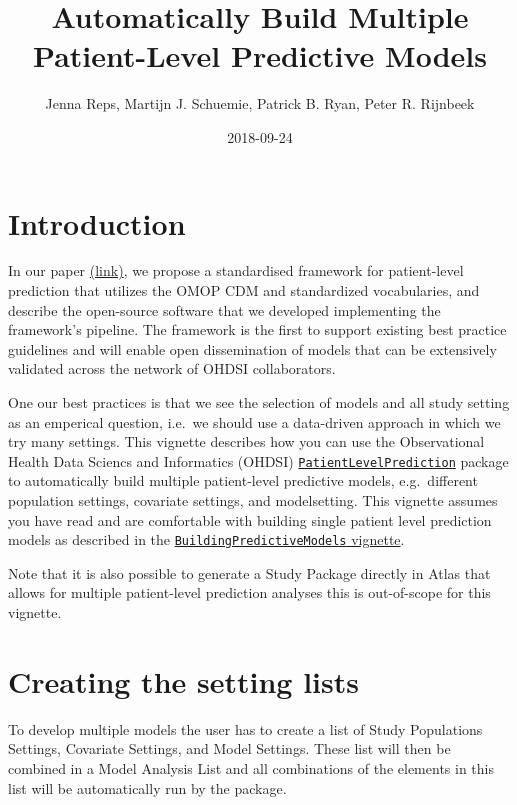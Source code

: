 \documentclass[]{article}
\title{Automatically Build Multiple Patient-Level Predictive Models}
\author{Jenna Reps, Martijn J. Schuemie, Patrick B. Ryan, Peter R. Rijnbeek}
\date{2018-09-24}
\begin{document}
\maketitle

{
\setcounter{tocdepth}{2}
\tableofcontents
}
\section{Introduction}\label{introduction}

In our paper
\href{https://academic.oup.com/jamia/article/25/8/969/4989437}{(link)},
we propose a standardised framework for patient-level prediction that
utilizes the OMOP CDM and standardized vocabularies, and describe the
open-source software that we developed implementing the framework's
pipeline. The framework is the first to support existing best practice
guidelines and will enable open dissemination of models that can be
extensively validated across the network of OHDSI collaborators.

One our best practices is that we see the selection of models and all
study setting as an emperical question, i.e.~we should use a data-driven
approach in which we try many settings. This vignette describes how you
can use the Observational Health Data Sciencs and Informatics (OHDSI)
\href{http://github.com/OHDSI/PatientLevelPrediction}{\texttt{PatientLevelPrediction}}
package to automatically build multiple patient-level predictive models,
e.g.~different population settings, covariate settings, and
modelsetting. This vignette assumes you have read and are comfortable
with building single patient level prediction models as described in the
\href{https://github.com/OHDSI/PatientLevelPrediction/blob/master/inst/doc/BuildingPredictiveModels.pdf}{\texttt{BuildingPredictiveModels}
vignette}.

Note that it is also possible to generate a Study Package directly in
Atlas that allows for multiple patient-level prediction analyses this is
out-of-scope for this vignette.

\section{Creating the setting lists}\label{creating-the-setting-lists}

To develop multiple models the user has to create a list of Study
Populations Settings, Covariate Settings, and Model Settings. These list
will then be combined in a Model Analysis List and all combinations of
the elements in this list will be automatically run by the package.
\end{document}
